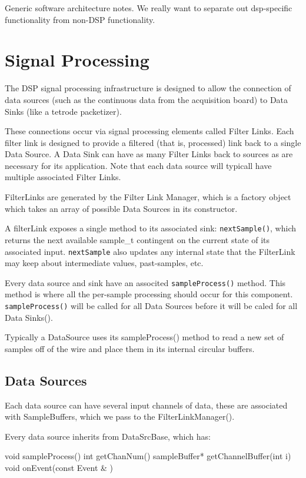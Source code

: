 Generic software architecture notes. We really want to separate out
dsp-specific functionality from non-DSP functionality.


\section{Signal Processing}

The DSP signal processing infrastructure is designed to allow the
connection of data sources (such as the continuous data from the
acquisition board) to Data Sinks (like a tetrode packetizer).

These connections occur via signal processing elements called Filter
Links. Each filter link is designed to provide a filtered (that is,
processed) link back to a single Data Source. A Data Sink can have as
many Filter Links back to sources as are necessary for its
application. Note that each data source will typicall have multiple
associated Filter Links.

FilterLinks are generated by the Filter Link Manager, which is a
factory object which takes an array of possible Data Sources in its
constructor.

A filterLink exposes a single method to its associated sink:
\texttt{nextSample()}, which returns the next available sample_t
contingent on the current state of its associated input.
\texttt{nextSample} also updates any internal state that the
FilterLink may keep about intermediate values, past-samples, etc.

Every data source and sink have an associted \texttt{sampleProcess()} method.
This method is where all the per-sample processing should occur for
this component. \texttt{sampleProcess()} will be called for all Data Sources
before it will be caled for all Data Sinks().

Typically a DataSource uses its sampleProcess() method to read a new
set of samples off of the wire and place them in its internal circular
buffers.

\subsection{Data Sources}
Each data source can have several input channels of data, these are associated with SampleBuffers, which we pass to the FilterLinkManager(). 

Every data source inherits from DataSrcBase, which has:

void sampleProcess()
int getChanNum()
sampleBuffer* getChannelBuffer(int i)
void onEvent(const Event & )

